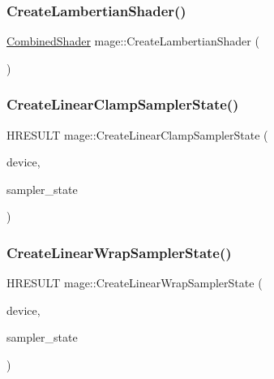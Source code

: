 \hypertarget{namespacemage_ab0bd21012fa29244f0f9b3201bebc2a5}{}\label{namespacemage_ab0bd21012fa29244f0f9b3201bebc2a5} 
\subsubsection{\texorpdfstring{Create\+Lambertian\+Shader()}{CreateLambertianShader()}}
{\footnotesize\ttfamily \hyperlink{structmage_1_1_combined_shader}{Combined\+Shader} mage\+::\+Create\+Lambertian\+Shader (\begin{DoxyParamCaption}{ }\end{DoxyParamCaption})}

\hypertarget{namespacemage_aa8f37da8dc3c10b5e4e1cd56be94ff95}{}\label{namespacemage_aa8f37da8dc3c10b5e4e1cd56be94ff95} 
\subsubsection{\texorpdfstring{Create\+Linear\+Clamp\+Sampler\+State()}{CreateLinearClampSamplerState()}}
{\footnotesize\ttfamily H\+R\+E\+S\+U\+LT mage\+::\+Create\+Linear\+Clamp\+Sampler\+State (\begin{DoxyParamCaption}\item[{I\+D3\+D11\+Device2 $\ast$}]{device,  }\item[{I\+D3\+D11\+Sampler\+State $\ast$$\ast$}]{sampler\+\_\+state }\end{DoxyParamCaption})}

\hypertarget{namespacemage_a714981745a2e53e5c55b04c4441bd2d0}{}\label{namespacemage_a714981745a2e53e5c55b04c4441bd2d0} 
\subsubsection{\texorpdfstring{Create\+Linear\+Wrap\+Sampler\+State()}{CreateLinearWrapSamplerState()}}
{\footnotesize\ttfamily H\+R\+E\+S\+U\+LT mage\+::\+Create\+Linear\+Wrap\+Sampler\+State (\begin{DoxyParamCaption}\item[{I\+D3\+D11\+Device2 $\ast$}]{device,  }\item[{I\+D3\+D11\+Sampler\+State $\ast$$\ast$}]{sampler\+\_\+state }\end{DoxyParamCaption})}

